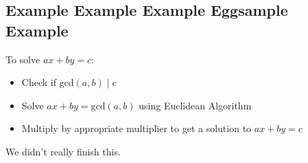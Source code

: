 \documentclass[10pt,oneside]{book}
\begin{document}
\subsection*{Example Example Example Eggsample Example}
To solve $ax +by = c$:
\begin{itemize}
    \item Check if gcd$(a,b)\mid c$
    \item Solve $ax + by = \text{gcd}(a,b)$ using Euclidean Algorithm
    \item Multiply by appropriate multiplier to get a solution to $ax + by =c$ 
\end{itemize}
We didn't really finish this. 
\end{document}
